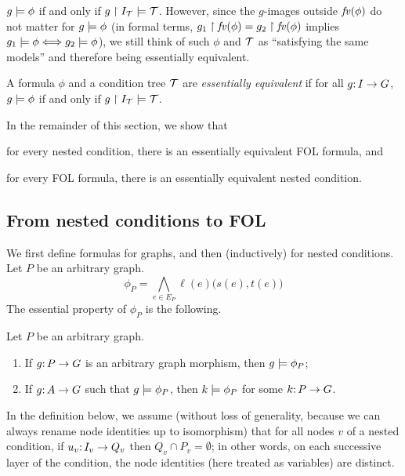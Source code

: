 $g\models \phi$ if and only if $g\restriction I_{\mathcal{T}} \models {\mathcal{T}}$. However, since the $g$-images outside $\mathit{fv}(\phi)$ do not matter for $g\models \phi$ (in formal terms, $g_1\restriction \mathit{fv}(\phi)=g_2\restriction \mathit{fv}(\phi)$ implies $g_1\models\phi \Longleftrightarrow g_2\models\phi$), we still think of such $\phi$ and ${\mathcal{T}}$ as ``satisfying the same models'' and therefore being essentially equivalent.

\begin{definition}\label{def:essential equivalence}
A formula $\phi$ and a condition tree ${\mathcal{T}}$ are \emph{essentially equivalent} if for all $g{:}\, I\rightarrow G$, $g\models \phi$ if and only if $g\restriction I_{\mathcal{T}}\models {\mathcal{T}}$.
\end{definition}

In the remainder of this section, we show that
%
\begin{inumerate}
\item for every nested condition, there is an essentially equivalent FOL formula, and
\item for every FOL formula, there is an essentially equivalent nested condition.
\end{inumerate}
%
\subsection{From nested conditions to FOL}

We first define formulas for graphs, and then (inductively) for nested conditions. Let $P$ be an arbitrary graph.
%
\[ \phi_P = \textstyle
 \bigwedge_{e\in E_P} \ell(e)\bigl(s(e),t(e)\bigr)
\]
%
The essential property of $\phi_P$ is the following.
%
\begin{proposition}\label{prop:graph formula}
Let $P$ be an arbitrary graph.
\begin{enumerate}
\item If $g{:}\, P\rightarrow G$ is an arbitrary graph morphism, then $g\models \phi_P$;
\item If $g{:}\, A\rightarrow G$ such that $g\models \phi_P$, then $k\models \phi_P$ for some $k{:}\, P\rightarrow G$.
\end{enumerate}
\end{proposition}
%
In the definition below, we assume (without loss of generality, because we can always rename node identities up to isomorphism) that for all nodes $v$ of a nested condition, if $u_v{:}\, I_v\rightarrow Q_v$ then $Q_v\cap P_v=\emptyset$; in other words, on each successive layer of the condition, the node identities (here treated as variables) are distinct. 

